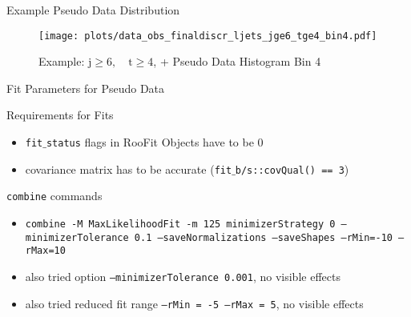\begin{frame}{Example Pseudo Data Distribution}
\begin{figure}
\centering
\texttt{[image: plots/data\_obs\_finaldiscr\_ljets\_jge6\_tge4\_bin4.pdf]}
\caption[Example: $\text{j}\geq 6,\quad \text{t}\geq 4$, \ttbarH \bbbar + \ttbar\bbbar Pseudo Data Histogram Bin 4]{Example: $\text{j}\geq 6,\quad \text{t}\geq 4$, \ttbarH \bbbar + \ttbar\bbbar Pseudo Data Histogram Bin 4}
\end{figure}
\end{frame}

\begin{frame}{Fit Parameters for Pseudo Data}
\begin{block}{Requirements for Fits}
\begin{itemize}
\item \texttt{fit$\_$status} flags in RooFit Objects have to be 0\\
\item covariance matrix has to be accurate (\texttt{fit$\_$b/s::covQual() == 3})
\end{itemize}

\end{block}

\begin{block}{\texttt{combine} commands}
\begin{itemize}
\item \texttt{combine -M MaxLikelihoodFit -m 125 \-\-minimizerStrategy 0 --minimizerTolerance 0.1 --saveNormalizations --saveShapes --rMin=-10 --rMax=10}
\item also tried option \texttt{--minimizerTolerance 0.001}, no visible effects
\item also tried reduced fit range \texttt{--rMin = -5 --rMax = 5}, no visible effects

\end{itemize}
\end{block}
\end{frame}

